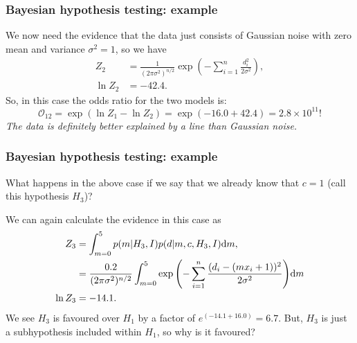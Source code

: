 \begin{frame}

\frametitle{Bayesian hypothesis testing: example}
\label{bayesianhypothesistesting:example}

We now need the evidence that the data just consists of Gaussian noise with zero mean and variance $\sigma^2 = 1$, so we have
\begin{align*}
Z_2 &= \frac{1}{(2\pi \sigma^2)^{n/2}} \exp{\left(-\sum_{i=1}^n\frac{d_i^2}{2\sigma^2} \right)}, \\
\ln{Z_2} &= -42.4.
\end{align*}
So, in this case the odds ratio for the two models is:
\[
\mathcal{O}_{12} = \exp{(\ln{Z_1}-\ln{Z_2})} = \exp{(-16.0 + 42.4)} = 2.8\times 10^{11}!
\]
\emph{The data is definitely better explained by a line than Gaussian noise.} 

\end{frame}

\begin{frame}

\frametitle{Bayesian hypothesis testing: example}
\label{bayesianhypothesistesting:example}

What happens in the above case if we say that we already know that $c = 1$ (call this
hypothesis $H_3$)?

We can again calculate the evidence in this case as
\begin{align*}
Z_3 &= \int_{m=0}^5 p(m|H_3,I)p(d|m,c,H_3,I) {\rm d}m,\\
&= \frac{0.2}{(2\pi \sigma^2)^{n/2}} \int_{m=0}^5 \exp{\left(-\sum_{i=1}^n\frac{(d_i - (mx_i+1))^2}{2\sigma^2} \right)} {\rm d}m \\
\ln{Z_3} &= -14.1.
\end{align*}
We see $H_3$ is favoured over $H_1$ by a factor of $e^{(-14.1+16.0)} = 6.7$. But, $H_3$ is just
a subhypothesis included within $H_1$, so why is it favoured?

\end{frame}

